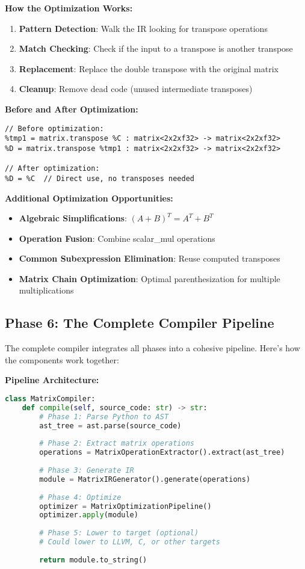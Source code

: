 \documentclass[11pt,a4paper]{article}
\begin{document}
\textbf{How the Optimization Works:}
\begin{enumerate}
    \item \textbf{Pattern Detection}: Walk the IR looking for transpose operations
    \item \textbf{Match Checking}: Check if the input to a transpose is another transpose
    \item \textbf{Replacement}: Replace the double transpose with the original matrix
    \item \textbf{Cleanup}: Remove dead code (unused intermediate transposes)
\end{enumerate}

\textbf{Before and After Optimization:}
\begin{lstlisting}[language=MLIR, caption=IR transformation example]
// Before optimization:
%tmp1 = matrix.transpose %C : matrix<2x2xf32> -> matrix<2x2xf32>
%D = matrix.transpose %tmp1 : matrix<2x2xf32> -> matrix<2x2xf32>

// After optimization:
%D = %C  // Direct use, no transposes needed
\end{lstlisting}

\textbf{Additional Optimization Opportunities:}
\begin{itemize}
    \item \textbf{Algebraic Simplifications}: $(A+B)^T = A^T + B^T$
    \item \textbf{Operation Fusion}: Combine scalar\_mul operations
    \item \textbf{Common Subexpression Elimination}: Reuse computed transposes
    \item \textbf{Matrix Chain Optimization}: Optimal parenthesization for multiple multiplications
\end{itemize}

\subsection{Phase 6: The Complete Compiler Pipeline}

The complete compiler integrates all phases into a cohesive pipeline. Here's how the components work together:

\textbf{Pipeline Architecture:}
\begin{lstlisting}[language=Python, caption=Main compiler driver structure]
class MatrixCompiler:
    def compile(self, source_code: str) -> str:
        # Phase 1: Parse Python to AST
        ast_tree = ast.parse(source_code)
        
        # Phase 2: Extract matrix operations
        operations = MatrixOperationExtractor().extract(ast_tree)
        
        # Phase 3: Generate IR
        module = MatrixIRGenerator().generate(operations)
        
        # Phase 4: Optimize
        optimizer = MatrixOptimizationPipeline()
        optimizer.apply(module)
        
        # Phase 5: Lower to target (optional)
        # Could lower to LLVM, C, or other targets
        
        return module.to_string()
\end{lstlisting}
\end{document}
